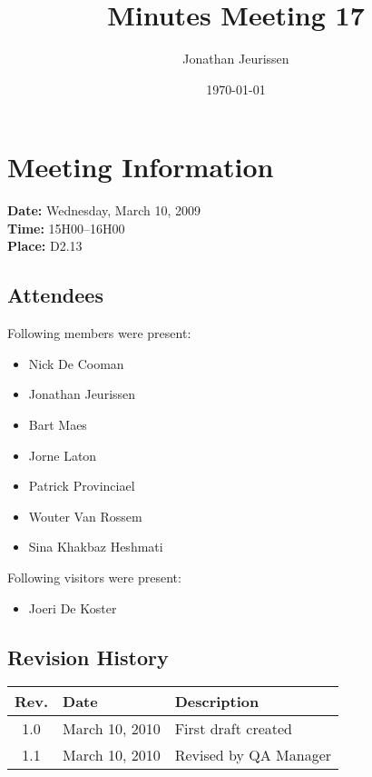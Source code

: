 \documentclass[a4paper, 12pt]{article}
\begin{document}
\title{Minutes Meeting 17}
\author{Jonathan Jeurissen}
\date{\today}

\maketitle	
	\section{Meeting Information}
		\textbf{Date:} Wednesday, March 10, 2009\\
		\textbf{Time:} 15H00--16H00\\
		\textbf{Place:} D2.13\\
		\subsection{Attendees}
Following members were present:
			\begin{itemize}
				\item Nick De Cooman
				\item Jonathan Jeurissen
				\item Bart Maes
				\item Jorne Laton
				\item Patrick Provinciael
				\item Wouter Van Rossem
				\item Sina Khakbaz Heshmati
			\end{itemize}
Following visitors were present:
			\begin{itemize}
				\item Joeri De Koster
			\end{itemize}

			 
			
		\subsection{Revision History}
			\begin{tabular}{c | l | l }
				\textbf{Rev.} & \textbf{Date} & \textbf{Description} \\
				\hline
				1.0 & March 10, 2010 & First draft created \\
				1.1 & March 10, 2010 & Revised by QA Manager \\
			\end{tabular}		
\end{document}
